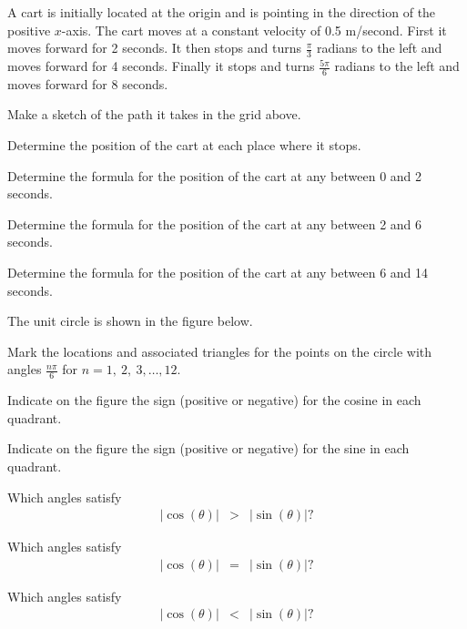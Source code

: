 \begin{problem}
\item A cart is initially located at the origin and is pointing in the
  direction of the positive $x$-axis. The cart moves at a constant
  velocity of 0.5 m/second. First it moves forward for 2 seconds. It
  then stops and turns $\frac{\pi}{3}$ radians to the left and moves
  forward for 4 seconds. Finally it stops and turns $\frac{5\pi}{6}$
  radians to the left and moves forward for 8 seconds.

  \scalebox{0.65}{}

  \begin{subproblem}
    \item Make a sketch of the path it takes in the grid above.
    \item Determine the position of the cart at each place where it
      stops. 
      \vfill
      \clearpage
    \item Determine the formula for the position of the cart at any
      between 0 and 2 seconds.
      \vfill
    \item Determine the formula for the position of the cart at any
      between 2 and 6 seconds.
      \vfill
    \item Determine the formula for the position of the cart at any
      between 6 and 14 seconds.
      \vfill
  \end{subproblem}

  \clearpage

\item The unit circle is shown in the figure below. 

  \scalebox{0.85}{}

  \begin{subproblem}
  \item Mark the locations and associated triangles for the points on
    the circle with angles $\frac{n\pi}{6}$ for $n=1,~2,~3,\ldots,12$.
  \item Indicate on the figure the sign (positive or negative) for the
    cosine in each quadrant.
  \item Indicate on the figure the sign (positive or negative) for the
    sine in each quadrant.

    \clearpage

  \item Which angles satisfy
    \begin{eqnarray*}
      |\cos(\theta)| & > & |\sin(\theta) |?
    \end{eqnarray*}
    \vfill
  \item Which angles satisfy
    \begin{eqnarray*}
      |\cos(\theta)| & = & |\sin(\theta) |?
    \end{eqnarray*}
    \vfill
  \item Which angles satisfy
    \begin{eqnarray*}
      |\cos(\theta)| & < & |\sin(\theta) |?
    \end{eqnarray*}
    \vfill
  \end{subproblem}


\end{problem}
